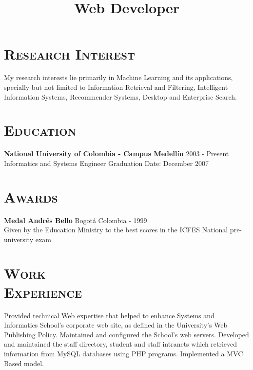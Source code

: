 \begin{resume}


\section{\textsc{Research Interest}}
My research interests lie primarily in Machine Learning and its applications, specially but  not limited to Information Retrieval and Filtering, Intelligent Information Systems, Recommender Systems, Desktop and Enterprise Search.
\newline

\section{\textsc{Education}}
\textbf{National University of Colombia - Campus Medell\'{i}n} \hfill 2003 - Present \\
Informatics and Systems Engineer \hfill Graduation Date: December 2007 \\
\newline

\section{\textsc{Awards}}
\textbf{Medal Andr\'{e}s Bello} \hfill  Bogot\'{a} Colombia - 1999 \\
Given by the Education Ministry to the best scores in the ICFES National pre-university exam \hfill \\
\newline



\section{\textsc{Work\\ Experience}}

\title{\textbf{Web Developer}}
\begin{position}
Provided technical Web expertise that helped to enhance Systems and Informatics School's corporate web site, 
as defined in the University's Web Publishing Policy. Maintained and configured the School's web servers. Developed and maintained the staff directory, student and staff intranets which retrieved information from MySQL databases using PHP programs. Implemented a MVC Based model.
\end{position}


\end{resume}
